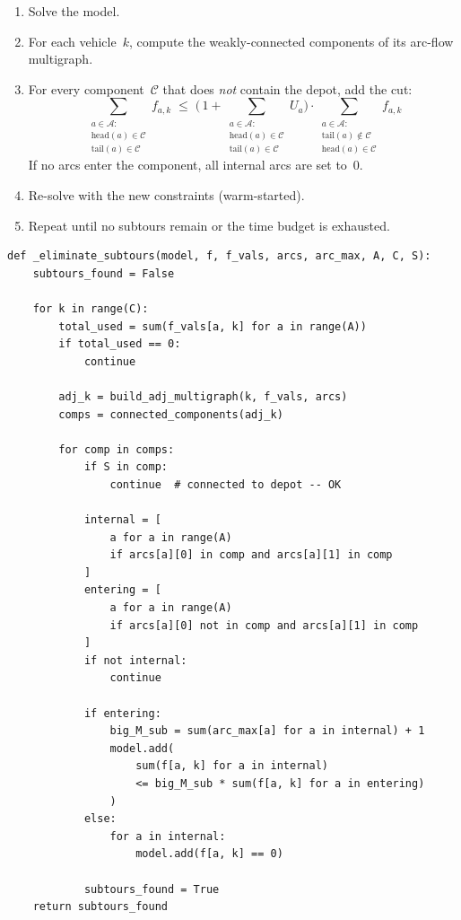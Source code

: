 \documentclass[11pt]{article}
\newcommand{\setA}{\mathcal{A}}   %
\begin{document}
\begin{enumerate}[nosep]
  \item Solve the model.
  \item For each vehicle~$k$, compute the weakly-connected components of its
        arc-flow multigraph.
  \item For every component~$\mathcal{C}$ that does \emph{not} contain the
        depot, add the cut:
        \begin{equation}\label{eq:subtour}
        \sum_{\substack{a \in \setA :\\[1pt] \mathrm{head}(a) \in \mathcal{C} \\[1pt] \mathrm{tail}(a) \in \mathcal{C}}}
             f_{a,k}
        \;\le\;
        \biggl(\,1 + \!\!\sum_{\substack{a \in \setA :\\[1pt] \mathrm{head}(a) \in \mathcal{C} \\[1pt] \mathrm{tail}(a) \in \mathcal{C}}}\!\! U_a \biggr)
        \cdot
        \sum_{\substack{a \in \setA :\\[1pt] \mathrm{tail}(a) \notin \mathcal{C} \\[1pt] \mathrm{head}(a) \in \mathcal{C}}}
             f_{a,k}
        \end{equation}
        If no arcs enter the component, all internal arcs are set to~$0$.
  \item Re-solve with the new constraints (warm-started).
  \item Repeat until no subtours remain or the time budget is exhausted.
\end{enumerate}

\begin{lstlisting}[caption={Subtour elimination implementation}]
def _eliminate_subtours(model, f, f_vals, arcs, arc_max, A, C, S):
    subtours_found = False

    for k in range(C):
        total_used = sum(f_vals[a, k] for a in range(A))
        if total_used == 0:
            continue

        adj_k = build_adj_multigraph(k, f_vals, arcs)
        comps = connected_components(adj_k)

        for comp in comps:
            if S in comp:
                continue  # connected to depot -- OK

            internal = [
                a for a in range(A)
                if arcs[a][0] in comp and arcs[a][1] in comp
            ]
            entering = [
                a for a in range(A)
                if arcs[a][0] not in comp and arcs[a][1] in comp
            ]
            if not internal:
                continue

            if entering:
                big_M_sub = sum(arc_max[a] for a in internal) + 1
                model.add(
                    sum(f[a, k] for a in internal)
                    <= big_M_sub * sum(f[a, k] for a in entering)
                )
            else:
                for a in internal:
                    model.add(f[a, k] == 0)

            subtours_found = True
    return subtours_found
\end{lstlisting}
\end{document}
